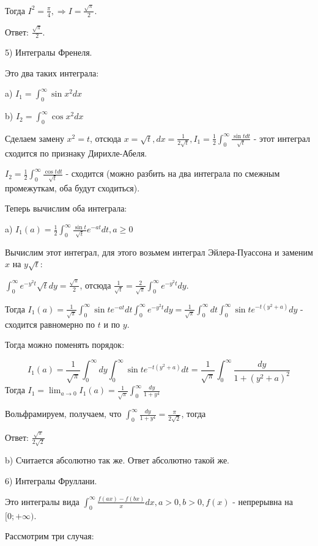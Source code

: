 \documentclass[12pt]{article}
\begin{document}
Тогда $I^2 = \frac{\pi}{4}, \Rightarrow I = \frac{\sqrt{\pi}}{2}$.\par
Ответ: $\frac{\sqrt{\pi}}{2}$.\par
5) Интегралы Френеля.\par
Это два таких интеграла:\par
a) $I_1 = \int_0^\infty \sin{x^2} dx$\par
b) $I_2 = \int_0^\infty \cos{x^2} dx$\par
Сделаем замену $x^2 = t$, отсюда $x = \sqrt{t}, dx = \frac{1}{2\sqrt{t}}, I_1 = \frac{1}{2} \int_0^\infty \frac{\sin{t} dt}{\sqrt{t}}$ - этот интеграл сходится по признаку Дирихле-Абеля.\par
$I_2 = \frac{1}{2} \int_0^\infty \frac{\cos{t}dt}{\sqrt{t}}$ - сходится (можно разбить на два интеграла по смежным промежуткам, оба будут сходиться).\par
Теперь вычислим оба интеграла:\par
a) $I_1(a) = \frac{1}{2} \int_0^\infty \frac{\sin{t}}{\sqrt{t}} e^{-at} dt, a \geq 0$\par
Вычислим этот интеграл, для этого возьмем интеграл Эйлера-Пуассона и заменим $x$ на $y \sqrt{t}$:\par
$\int_0^\infty e^{-y^2t}\sqrt{t} dy = \frac{\sqrt{\pi}}{2}$, отсюда $\frac{1}{\sqrt{t}} = \frac{2}{\sqrt{\pi}} \int_0^\infty e^{-y^2t}dy$.\par
Тогда $I_1(a) = \frac{1}{\sqrt{\pi}} \int_0^\infty \sin{t} e^{-at} dt \int_0^\infty e^{-y^2t}dy = \frac{1}{\sqrt{\pi}} \int_0^\infty dt \int_0^\infty \sin{t} e^{-t(y^2+a)} dy$ - сходится равномерно по $t$ и по $y$.\par
Тогда можно поменять порядок:\par
$$I_1(a) = \frac{1}{\sqrt{\pi}} \int_0^\infty dy \int_0^\infty \sin{t} e^{-t(y^2+a)}dt = \frac{1}{\sqrt{\pi}} \int_0^\infty \frac{dy}{1+(y^2+a)^2}$$
Тогда $I_1 = \lim_{a\to 0} I_1(a) = \frac{1}{\sqrt{\pi}} \int_0^\infty \frac{dy}{1+y^4}$\par
Вольфрамируем, получаем, что $\int_0^\infty \frac{dy}{1+y^4} = \frac{\pi}{2\sqrt{2}}$, тогда\par
Ответ: $\frac{\sqrt{\pi}}{2\sqrt{2}}$\par
b) Считается абсолютно так же. Ответ абсолютно такой же.\par
6) Интегралы Фруллани.\par
Это интегралы вида $\int_0^\infty \frac{f(ax)-f(bx)}{x} dx, a > 0, b > 0, f(x)$ - непрерывна на $[0; +\infty)$.\par
Рассмотрим три случая:\par
\end{document}
